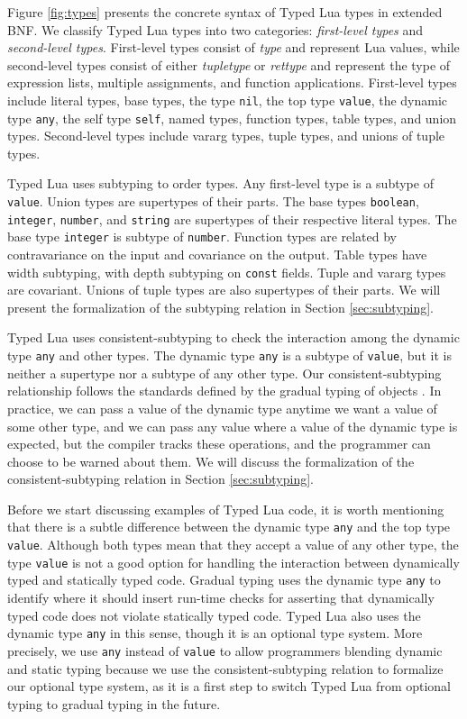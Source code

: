 Figure \ref{fig:types} presents the concrete syntax of
Typed Lua types in extended BNF.
We classify Typed Lua types into two categories:
\emph{first-level types} and \emph{second-level types}.
First-level types consist of \emph{type} and represent Lua values,
while second-level types consist of either \emph{tupletype} or
\emph{rettype} and represent the type of expression lists,
multiple assignments, and function applications.
First-level types include literal types, base types, the type \texttt{nil},
the top type \texttt{value}, the dynamic type \texttt{any},
the self type \texttt{self}, named types, function types, table types,
and union types.
Second-level types include vararg types, tuple types, and unions of tuple types.

Typed Lua uses subtyping to order types.
Any first-level type is a subtype of \texttt{value}.
Union types are supertypes of their parts.
The base types \texttt{boolean}, \texttt{integer}, \texttt{number},
and \texttt{string} are supertypes of their respective literal types.
The base type \texttt{integer} is subtype of \texttt{number}.
Function types are related by contravariance on the input
and covariance on the output.
Table types have width subtyping, with depth subtyping on
\texttt{const} fields.
Tuple and vararg types are covariant.
Unions of tuple types are also supertypes of their parts.
We will present the formalization of the subtyping relation
in Section \ref{sec:subtyping}.

Typed Lua uses consistent-subtyping to check the interaction among the
dynamic type \texttt{any} and other types.
The dynamic type \texttt{any} is a subtype of \texttt{value}, but it is
neither a supertype nor a subtype of any other type.
Our consistent-subtyping relationship follows the standards defined
by the gradual typing of objects \cite{siek2007objects,siek2013mutable}.
In practice, we can pass a value of the dynamic type anytime we want
a value of some other type, and we can pass any value where a
value of the dynamic type is expected, but the compiler tracks these
operations, and the programmer can choose to be warned about them.
We will discuss the formalization of the consistent-subtyping
relation in Section \ref{sec:subtyping}.

Before we start discussing examples of Typed Lua code, it is worth
mentioning that there is a subtle difference between the dynamic
type \texttt{any} and the top type \texttt{value}.
Although both types mean that they accept a value of any other type,
the type \texttt{value} is not a good option for handling the
interaction between dynamically typed and statically typed code.
Gradual typing uses the dynamic type \texttt{any} to identify
where it should insert run-time checks for asserting that dynamically
typed code does not violate statically typed code.
Typed Lua also uses the dynamic type \texttt{any} in this sense,
though it is an optional type system.
More precisely, we use \texttt{any} instead of \texttt{value} to allow
programmers blending dynamic and static typing because we use the
consistent-subtyping relation to formalize our optional type system,
as it is a first step to switch Typed Lua from optional typing to
gradual typing in the future.


